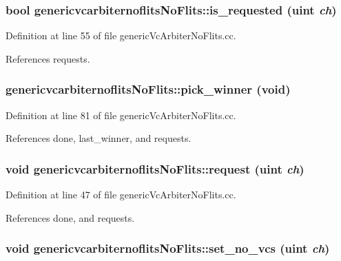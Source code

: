 \subsubsection[{is\_\-requested}]{\setlength{\rightskip}{0pt plus 5cm}bool genericvcarbiternoflitsNoFlits::is\_\-requested ({\bf uint} {\em ch})}\label{classgenericvcarbiternoflitsNoFlits_9a0299945d0e4d627534ffcfd06a8921}




Definition at line 55 of file genericVcArbiterNoFlits.cc.

References requests.
\subsubsection[{pick\_\-winner}]{ genericvcarbiternoflitsNoFlits::pick\_\-winner (void)}\label{classgenericvcarbiternoflitsNoFlits_8d28e69dbcb2e4bd1bce785ade0b4573}




Definition at line 81 of file genericVcArbiterNoFlits.cc.

References done, last\_\-winner, and requests.
\subsubsection[{request}]{\setlength{\rightskip}{0pt plus 5cm}void genericvcarbiternoflitsNoFlits::request ({\bf uint} {\em ch})}\label{classgenericvcarbiternoflitsNoFlits_679b8b6bc3be8c5e28635939a10ee2b7}




Definition at line 47 of file genericVcArbiterNoFlits.cc.

References done, and requests.
\subsubsection[{set\_\-no\_\-vcs}]{\setlength{\rightskip}{0pt plus 5cm}void genericvcarbiternoflitsNoFlits::set\_\-no\_\-vcs ({\bf uint} {\em ch})}\label{classgenericvcarbiternoflitsNoFlits_6d61b38c12a4dcae8137849232106541}




